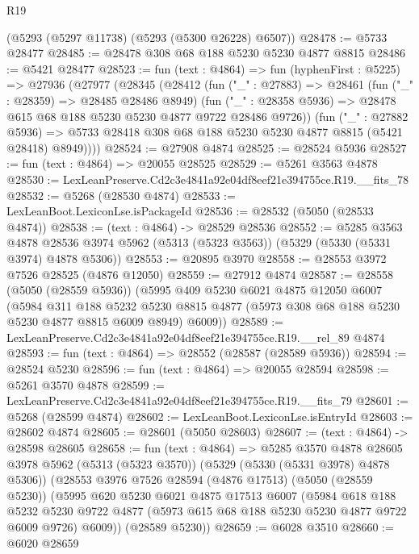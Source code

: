 \begin{lexlean}{R19}
\begin{coremodule}
    (@5293 (@5297 @11738) (@5293 (@5300 @26228) @6507))
@28478 := @5733 @28477
@28485 := @28478 @308 @68 @188 @5230 @5230 @4877 @8815
@28486 := @5421 @28477
@28523 := fun (text : @4864) =>
  fun (hyphenFirst : @5225) =>
  @27936
    (@27977
      (@28345
        (@28412
          (fun ("_" : @27883) =>
          @28461
            (fun ("_" : @28359) => @28485 @28486 @8949)
            (fun ("_" : @28358 @5936) => @28478 @615 @68 @188 @5230 @5230 @4877 @9722 @28486 @9726))
          (fun ("_" : @27882 @5936) =>
          @5733 @28418 @308 @68 @188 @5230 @5230 @4877 @8815 (@5421 @28418) @8949))))
@28524 := @27908 @4874
@28525 := @28524 @5936
@28527 := fun (text : @4864) => @20055 @28525
@28529 := @5261 @3563 @4878
@28530 := LexLeanPreserve.Cd2c3e4841a92e04df8eef21e394755ce.R19.__fits_78
@28532 := @5268 (@28530 @4874)
@28533 := LexLeanBoot.LexiconLse.isPackageId
@28536 := @28532 (@5050 (@28533 @4874))
@28538 := (text : @4864) -> @28529 @28536
@28552 := @5285
    @3563
    @4878
    @28536
    @3974
    @5962
    (@5313 (@5323 @3563))
    (@5329 (@5330 (@5331 @3974) @4878 @5306))
@28553 := @20895 @3970
@28558 := @28553 @3972 @7526 @28525 (@4876 @12050)
@28559 := @27912 @4874
@28587 := @28558
    (@5050 (@28559 @5936))
    (@5995
      @409
      @5230
      @6021
      @4875
      @12050
      @6007
      (@5984
        @311
        @188
        @5232
        @5230
        @8815
        @4877
        (@5973 @308 @68 @188 @5230 @5230 @4877 @8815 @6009 @8949)
        @6009))
@28589 := LexLeanPreserve.Cd2c3e4841a92e04df8eef21e394755ce.R19.__rel_89 @4874
@28593 := fun (text : @4864) => @28552 (@28587 (@28589 @5936))
@28594 := @28524 @5230
@28596 := fun (text : @4864) => @20055 @28594
@28598 := @5261 @3570 @4878
@28599 := LexLeanPreserve.Cd2c3e4841a92e04df8eef21e394755ce.R19.__fits_79
@28601 := @5268 (@28599 @4874)
@28602 := LexLeanBoot.LexiconLse.isEntryId
@28603 := @28602 @4874
@28605 := @28601 (@5050 @28603)
@28607 := (text : @4864) -> @28598 @28605
@28658 := fun (text : @4864) =>
  @5285
    @3570
    @4878
    @28605
    @3978
    @5962
    (@5313 (@5323 @3570))
    (@5329 (@5330 (@5331 @3978) @4878 @5306))
    (@28553
      @3976
      @7526
      @28594
      (@4876 @17513)
      (@5050 (@28559 @5230))
      (@5995
        @620
        @5230
        @6021
        @4875
        @17513
        @6007
        (@5984
          @618
          @188
          @5232
          @5230
          @9722
          @4877
          (@5973 @615 @68 @188 @5230 @5230 @4877 @9722 @6009 @9726)
          @6009))
      (@28589 @5230))
@28659 := @6028 @3510
@28660 := @6020 @28659

\end{coremodule}
\end{lexlean}
